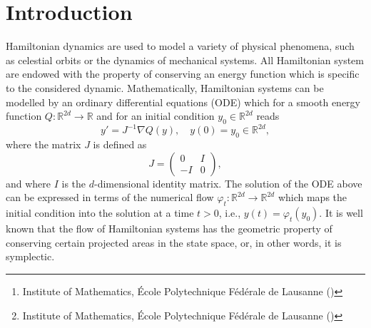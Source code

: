 \documentclass{siamart1116}
\title{{\TheTitle}}
\author{Assyr Abdulle\thanks{Institute of Mathematics, \'Ecole Polytechnique F\'ed\'erale de Lausanne (\email{assyr.abdulle@epfl.ch})}
		\and
		Giacomo Garegnani\thanks{Institute of Mathematics, \'Ecole Polytechnique F\'ed\'erale de Lausanne (\email{giacomo.garegnani@epfl.ch})}}
\numberwithin{theorem}{section}
\renewcommand{\phi}{\varphi}
\newcommand{\R}{\mathbb{R}}
\newcommand{\corr}[1]{{\color{red}#1}}
\begin{document}
\maketitle

\begin{abstract} The long-time energy conservation of the random time stepping Runge-Kutta method (RTS-RK) introduced in \corr{[A. Abdulle and G. Garegnani, \textit{Random time step probabilistic methods for uncertainty quantification in chaotic and geometric numerical integration}, 2018]} are studied. Departing from classical backward error analysis tools, we are able to prove via Brouwer's argument \corr{[D. Brower, \textit{On the accumulation of errors in numerical integration}, 1937]} that the accumulation of errors due to random perturbations causes an energy drift which grows as the square root of time. \corr{Nonetheless, we are able to prove that the approximation in the mean sense of the Hamiltonian given by our probabilistic integrator has the same quality as an equivalent deterministic symplectic method over time spans of polynomial length.} Numerical examples confirm our theoretical findings and show the effectiveness of the probabilistic approach in the frame of Bayesian inverse problems.
\end{abstract}

\section{Introduction}

Hamiltonian dynamics are used to model a variety of physical phenomena, such as celestial orbits or the dynamics of mechanical systems. All Hamiltonian system are endowed with the property of conserving an energy function which is specific to the considered dynamic. Mathematically, Hamiltonian systems can be modelled by an ordinary differential equations (ODE) which for a smooth energy function $Q\colon \R^{2d} \to \R$ and for an initial condition $y_0 \in \R^{2d}$ reads
\begin{equation}
y' = J^{-1}\nabla Q(y), \quad y(0) = y_0 \in \R^{2d},
\end{equation}
where the matrix $J$ is defined as
\begin{equation}
J = \begin{pmatrix} 0 & I \\ -I & 0 \end{pmatrix},
\end{equation}
and where $I$ is the $d$-dimensional identity matrix. The solution of the ODE above can be expressed in terms of the numerical flow $\phi_t \colon \R^{2d} \to \R^{2d}$ which maps the initial condition into the solution at a time $t > 0$, i.e., $y(t) = \phi_t(y_0)$. It is well known that the flow of Hamiltonian systems has the geometric property of conserving \corr{certain projected} areas in the state space, or, in other words, it is symplectic. 
\end{document}
